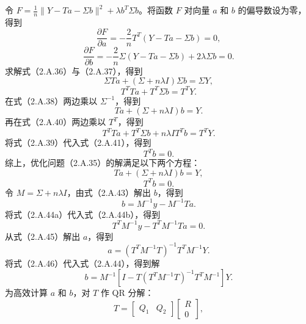 令 $F=\frac1n\|Y-Ta-\Sigma b\|^2+\lambda b^T\Sigma b$。将函数 $F$ 对向量 $a$ 和 $b$ 的偏导数设为零，得到
\begin{equation}
\frac{\partial F}{\partial a}
 =-\frac2nT^T(Y-Ta-\Sigma b)=0,\tag{2.A.36}
\end{equation}
\begin{equation}
\frac{\partial F}{\partial b}
 =-\frac2n\Sigma(Y-Ta-\Sigma b)+2\lambda\Sigma b=0.\tag{2.A.37}
\end{equation}
求解式（2.A.36）与（2.A.37），得到
\begin{equation}
\Sigma Ta+(\Sigma+n\lambda I)\Sigma b=\Sigma Y,\tag{2.A.38}
\end{equation}
\begin{equation}
T^TTa+T^T\Sigma b=T^TY.\tag{2.A.39}
\end{equation}
在式（2.A.38）两边乘以 $\Sigma^{-1}$，得到
\begin{equation}
Ta+(\Sigma+n\lambda I)b=Y.\tag{2.A.40}
\end{equation}
再在式（2.A.40）两边乘以 $T^T$，得到
\begin{equation}
T^TTa+T^T\Sigma b+n\lambda IT^Tb=T^TY.\tag{2.A.41}
\end{equation}
将式（2.A.39）代入式（2.A.41），得到
\begin{equation}
T^Tb=0.\tag{2.A.42}
\end{equation}
综上，优化问题（2.A.35）的解满足以下两个方程：
\begin{equation}
Ta+(\Sigma+n\lambda I)b=Y,\tag{2.A.43}
\end{equation}
\begin{equation}
T^Tb=0.\tag{2.A.44a}
\end{equation}
令 $M=\Sigma+n\lambda I$，由式（2.A.43）解出 $b$，得到
\begin{equation}
b=M^{-1}y-M^{-1}Ta.\tag{2.A.44b}
\end{equation}
将式（2.A.44a）代入式（2.A.44b），得到
\begin{equation}
T^TM^{-1}y-T^TM^{-1}Ta=0.\tag{2.A.45}
\end{equation}
从式（2.A.45）解出 $a$，得到
\begin{equation}
a=(T^TM^{-1}T)^{-1}T^TM^{-1}Y.\tag{2.A.46}
\end{equation}
将式（2.A.46）代入式（2.A.44），得到解
\begin{equation}
b=M^{-1}\left[I-T(T^TM^{-1}T)^{-1}T^TM^{-1}\right]Y.\tag{2.A.47}
\end{equation}
为高效计算 $a$ 和 $b$，对 $T$ 作 QR 分解：
\[
T=\begin{bmatrix}Q_1&Q_2\end{bmatrix}
  \begin{bmatrix}R\\0\end{bmatrix},
\]
